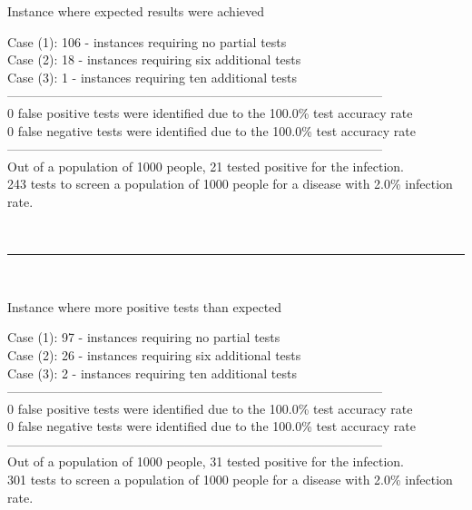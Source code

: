 \documentclass[letterpaper, 10pt,DIV=13]{scrartcl}
\numberwithin{equation}{section} %
\numberwithin{figure}{section} %
\numberwithin{table}{section} %
\begin{document}
\begin{displayquote}
\begin{center}
    Instance where expected results were achieved
\end{center}
Case (1): 106 - instances requiring no partial tests\\
Case (2): 18 - instances requiring six additional tests\\
Case (3): 1 - instances requiring ten additional tests\\
-----------------------------------------------------------------------------------------\\
0 false positive tests were identified due to the 100.0\% test accuracy rate\\
0 false negative tests were identified due to the 100.0\% test accuracy rate\\
-----------------------------------------------------------------------------------------\\
Out of a population of 1000 people, 21 tested positive for the infection.\\
243 tests to screen a population of 1000 people for a disease with 2.0\% infection rate.\\
\end{displayquote}
\\
\begin{center}
\rule{12cm}{.4pt}
\end{center}
\\
\begin{displayquote}
\begin{center}
    Instance where more positive tests than expected
\end{center}
Case (1): 97 - instances requiring no partial tests\\
Case (2): 26 - instances requiring six additional tests\\
Case (3): 2 - instances requiring ten additional tests\\
-----------------------------------------------------------------------------------------\\
0 false positive tests were identified due to the 100.0\% test accuracy rate\\
0 false negative tests were identified due to the 100.0\% test accuracy rate\\
-----------------------------------------------------------------------------------------\\
Out of a population of 1000 people, 31 tested positive for the infection.\\
301 tests to screen a population of 1000 people for a disease with 2.0\% infection rate.\\
\end{displayquote}
\end{document}
